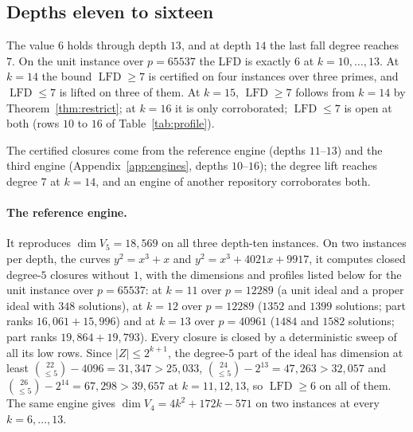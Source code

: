 \documentclass[11pt]{article}
\theoremstyle{definition}\newtheorem{definition}[theorem]{Definition}
\theoremstyle{remark}\newtheorem{remark}[theorem]{Remark}
\newcommand{\lfd}{\operatorname{LFD}}
\begin{document}
\subsection{Depths eleven to sixteen}\label{sec:depth14}
The value $6$ holds through depth $13$, and at depth $14$ the last fall
degree reaches $7$. On the unit instance over $p=65537$ the LFD is exactly
$6$ at $k=10,\ldots,13$. At $k=14$ the bound $\lfd\ge7$ is certified on four
instances over three primes, and $\lfd\le7$ is lifted on three of them. At
$k=15$, $\lfd\ge7$ follows from $k=14$ by Theorem~\ref{thm:restrict}; at
$k=16$ it is only corroborated; $\lfd\le7$ is open at both (rows $10$ to
$16$ of Table~\ref{tab:profile}).

The certified closures come from the reference engine (depths $11$--$13$) and
the third engine (Appendix~\ref{app:engines}, depths $10$--$16$); the degree
lift reaches degree $7$ at $k=14$, and an engine of another repository
corroborates both.

\paragraph{The reference engine.} It reproduces $\dim V_5=18{,}569$ on all
three depth-ten instances. On two instances per depth, the curves
$y^2=x^3+x$ and $y^2=x^3+4021x+9917$, it computes closed degree-$5$
closures without $1$, with the dimensions and profiles listed below for the
unit instance over $p=65537$: at $k=11$ over $p=12289$ (a unit ideal and a
proper ideal with $348$ solutions), at $k=12$ over $p=12289$ ($1352$ and
$1399$ solutions; part ranks $16{,}061+15{,}996$) and at $k=13$ over
$p=40961$ ($1484$ and $1582$ solutions; part ranks $19{,}864+19{,}793$).
Every closure is closed by a deterministic sweep of all its low rows. Since
$|Z|\le2^{k+1}$, the degree-$5$ part of the ideal has dimension at least
$\binom{22}{\le5}-4096=31{,}347>25{,}033$,
$\binom{24}{\le5}-2^{13}=47{,}263>32{,}057$ and
$\binom{26}{\le5}-2^{14}=67{,}298>39{,}657$ at $k=11,12,13$, so $\lfd\ge6$
on all of them. The same engine gives $\dim V_4=4k^2+172k-571$ on two
instances at every $k=6,\ldots,13$.
\end{document}
